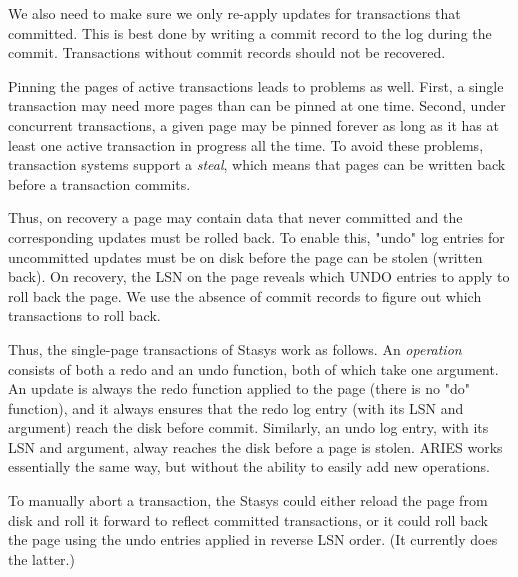 \documentclass[letterpaper,twocolumn,10pt]{article}
\newcommand{\yad}{Stasys\xspace}
\begin{document}
We also need to make sure we only re-apply updates for transactions
that committed.  This is best done by writing a commit record to the
log during the commit.  Transactions without commit records should not
be recovered.

Pinning the pages of active transactions leads to problems as well.
First, a single transaction may need more pages than can be pinned at
one time. Second, under concurrent transactions, a given page may be
pinned forever as long as it has at least one active transaction in
progress all the time.  To avoid these problems, transaction systems
support a {\em steal}, which means that pages can be written back
before a transaction commits. 

Thus, on recovery a page may contain data that never committed and the
corresponding updates must be rolled back.  To enable this, "undo" log
entries for uncommitted updates must be on disk before the page can be
stolen (written back).  On recovery, the LSN on the page reveals which
UNDO entries to apply to roll back the page. We use the absence of
commit records to figure out which transactions to roll back.

Thus, the single-page transactions of \yad work as follows.  An {\em
operation} consists of both a redo and an undo function, both of which
take one argument. An update is always the redo function applied to
the page (there is no "do" function), and it always ensures that the
redo log entry (with its LSN and argument) reach the disk before
commit.  Similarly, an undo log entry, with its LSN and argument,
alway reaches the disk before a page is stolen.  ARIES works
essentially the same way, but without the ability to easily add new
operations.

To manually abort a transaction, the \yad could either reload the page
from disk and roll it forward to reflect committed transactions, or it
could roll back the page using the undo entries applied in reverse LSN
order. (It currently does the latter.)
\end{document}
